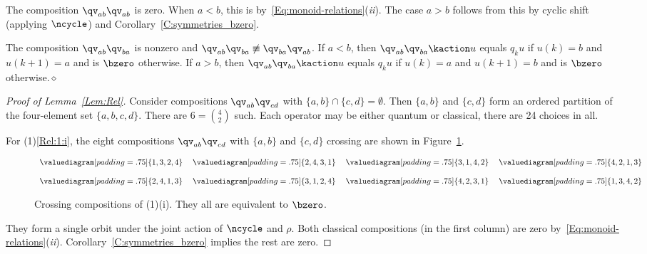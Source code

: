\begin{remark}
  The composition $\qv_{ab}\qv_{ab}$ is zero.
  When $a<b$, this is by~\eqref{Eq:monoid-relations}({\it ii}).  The case $a>b$ follows from this by cyclic shift (applying $\ncycle$) and 
  Corollary~\ref{C:symmetries_bzero}.

  The composition $\qv_{ab}\qv_{ba}$ is nonzero and $\qv_{ab}\qv_{ba}\not\equiv \qv_{ba}\qv_{ab}$.
  If $a<b$, then $\qv_{ab}\qv_{ba}\kaction u$ equals $q_k u$ if $u(k)=b$ and $u(k{+}1)=a$ and is $\bzero$ otherwise.
  If $a>b$, then $\qv_{ab}\qv_{ba}\kaction u$ equals $q_k u$ if $u(k)=a$ and $u(k{+}1)=b$ and is $\bzero$ otherwise.\hfill$\diamond$
\end{remark}

\begin{proof}[Proof of Lemma~\ref{Lem:Rel}]
  Consider compositions $\qv_{ab}\qv_{cd}$ with $\{a,b\}\cap\{c,d\}=\emptyset$.
  Then $\{a,b\}$ and $\{c,d\}$ form an ordered partition of the four-element set $\{a,b,c,d\}$.
  There are $6=\binom{4}{2}$ such.
  Each operator may be either quantum or classical, there are 24 choices in all.
  
  For (1)\ref{Rel:1:i},
  the eight compositions  $\qv_{ab}\qv_{cd}$ with $\{a,b\}$ and $\{c,d\}$ crossing are shown in Figure~\ref{fig:crossing-operators}.

\begin{figure}[htpb]
 \centering
  \begin{equation*}
    \begin{array}{l@{\hskip1.25em}l@{\hskip1.25em}l@{\hskip1.25em}l}
        \valuediagram[padding=.75]{{1,3},{2,4}} & \valuediagram[padding=.75]{{2,4},{3,1}}
      & \valuediagram[padding=.75]{{3,1},{4,2}} & \valuediagram[padding=.75]{{4,2},{1,3}}
            \\ \\
        \valuediagram[padding=.75]{{2,4},{1,3}} & \valuediagram[padding=.75]{{3,1},{2,4}}
      & \valuediagram[padding=.75]{{4,2},{3,1}} & \valuediagram[padding=.75]{{1,3},{4,2}}
    \end{array}
 \end{equation*}
  \caption{Crossing compositions of (1)(i).
   They all are equivalent to $\bzero$.}
 \label{fig:crossing-operators}
\end{figure}

 They form a single orbit under the joint action of $\ncycle$ and $\rho$.
 Both classical compositions (in the first column) are zero by~\eqref{Eq:monoid-relations}({\it ii}).
 Corollary~\ref{C:symmetries_bzero} implies the rest are zero.


\end{proof}
